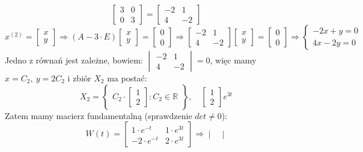 \begin{przyk}
$$\begin{bmatrix}
3 & 0\\
0 & 3
\end{bmatrix}=
\begin{bmatrix}
-2 & 1\\
4 & -2
\end{bmatrix}$$
$$x^{(2)}=\begin{bmatrix}
x\\
y
\end{bmatrix}\Rightarrow (A-3\cdot E)
\begin{bmatrix}
x\\
y
\end{bmatrix}=
\begin{bmatrix}
0\\
0
\end{bmatrix}\Rightarrow
\begin{bmatrix}
-2 & 1\\
4 & -2
\end{bmatrix}
\begin{bmatrix}
x\\
y
\end{bmatrix}=
\begin{bmatrix}
0\\
0
\end{bmatrix}\Rightarrow
\left\{\begin{array}{l}
-2x+y=0\\
4x-2y=0
\end{array}\right.$$
Jedno z równań jest zależne, bowiem: $
\begin{vmatrix}
-2 & 1\\
4 & -2
\end{vmatrix}=0$,
więc mamy $x=C_2,\ y=2C_2$ i zbiór $X_2$ ma postać: $$X_2=
\left\{\begin{array}{c}
C_2\cdot
\begin{bmatrix}
1\\
2
\end{bmatrix}:C_2\in\mathbb{R}
\end{array}\right\},\quad 
\begin{bmatrix}
1\\
2
\end{bmatrix}e^{3t}$$
Zatem mamy macierz fundamentalną (sprawdzenie $det\neq 0$): $$W(t)=
\begin{bmatrix}
1\cdot e^{-t} & 1\cdot e^{3t}\\
-2\cdot e^{-t} & 2\cdot e^{3t}
\end{bmatrix}\Rightarrow
\begin{vmatrix}

\end{vmatrix}$$
\end{przyk}
